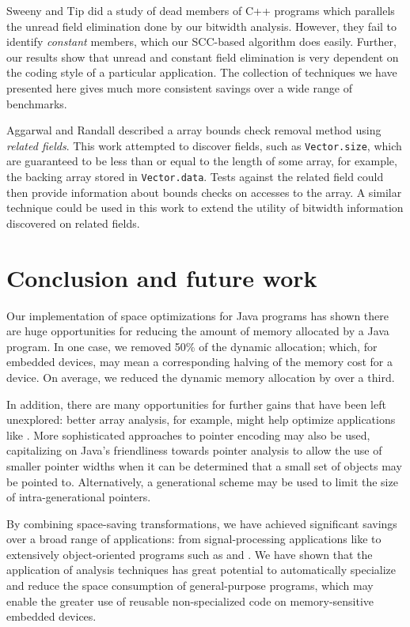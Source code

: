 \documentclass[preprint]{acmconf}
\begin{document}
Sweeny and Tip \cite{SweeneyTip98DeadDataMembers} did a study of dead
members of C++ programs which parallels the unread field
elimination done by our bitwidth analysis.  However, they
fail to identify {\it constant} members, which our SCC-based algorithm
does easily.  Further, our results show that unread and constant field
elimination is very dependent on the coding style of a particular
application.  The collection of techniques we have presented here
gives much more consistent savings over a wide range of benchmarks.

Aggarwal and Randall \cite{aggarwal01} described a array bounds check
removal method using {\it related fields}.  This work attempted to
discover fields, such as {\tt Vector.size}, which are guaranteed to be
less than or equal to the length of some array, for example, the
backing array stored in {\tt Vector.data}.  Tests against the related
field could then provide information about bounds checks on accesses
to the array.  A similar technique could be used in this work to
extend the utility of bitwidth information discovered on related fields.

\section{Conclusion and future work}
Our implementation of space optimizations for Java programs has shown
there are huge opportunities for reducing the amount of memory
allocated by a Java program.  In one case, we removed 50\% of the
dynamic allocation; which, for embedded devices, may mean a
corresponding halving of the memory cost for a device.
On average, we reduced the dynamic memory allocation by over a third.

In addition, there are many opportunities for further gains that have
been left unexplored: better array analysis, for example, might help
optimize applications like .  More sophisticated
approaches to pointer encoding may also be used, capitalizing on
Java's friendliness towards pointer analysis
to allow the use of smaller pointer widths when
it can be determined that a small set of objects may be pointed
to.  Alternatively, a generational scheme may be used to limit the
size of intra-generational pointers.

By combining space-saving transformations, we have achieved
significant savings over a broad range of applications: from
signal-processing applications like  to
extensively object-oriented programs such as  and
.
We have shown that the application of analysis techniques has great
potential to automatically specialize and reduce the space consumption
of general-purpose programs,
which may enable the greater use of reusable non-specialized code on
memory-sensitive embedded devices.





%
\end{document}
